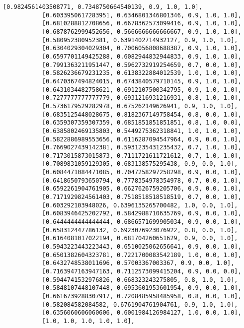 \documentclass[11pt]{article}
\begin{document}
\begin{Verbatim}[commandchars=\\\{\}]
           [0.9824561403508771, 0.7348750664540139, 0.9, 1.0, 1.0],
           [0.6033950617283951, 0.6346801346801346, 0.9, 1.0, 1.0],
           [0.6810288812708656, 0.6678362573099416, 0.9, 1.0, 1.0],
           [0.6878762999452656, 0.5666666666666667, 0.9, 1.0, 1.0],
           [0.580952380952381, 0.6391402714932127, 0.9, 1.0, 1.0],
           [0.6304029304029304, 0.7006056808688387, 0.9, 1.0, 1.0],
           [0.6597701149425288, 0.6082944832944833, 0.9, 1.0, 1.0],
           [0.7991363211951447, 0.5962732919254659, 0.7, 0.0, 1.0],
           [0.5826236679231235, 0.6138322884012539, 1.0, 1.0, 1.0],
           [0.6470367494824015, 0.6743840579710145, 0.9, 1.0, 1.0],
           [0.6431034482758621, 0.6912107500342795, 0.9, 1.0, 1.0],
           [0.7277777777777779, 0.6931216931216931, 0.8, 1.0, 1.0],
           [0.5736179529282978, 0.675262149626941, 0.9, 1.0, 1.0],
           [0.6835125448028675, 0.8182367149758454, 0.8, 0.0, 1.0],
           [0.6359307359307359, 0.6851851851851851, 0.8, 1.0, 0.0],
           [0.6385802469135803, 0.5449275362318841, 1.0, 1.0, 1.0],
           [0.5822886989553656, 0.6116287094547964, 0.9, 0.0, 1.0],
           [0.7669027439142381, 0.5931235431235432, 0.7, 1.0, 1.0],
           [0.7173015873015873, 0.7111721611721612, 0.7, 1.0, 1.0],
           [0.7089831059129305, 0.683138575295438, 0.9, 0.0, 1.0],
           [0.6084471084471085, 0.7047258297258298, 0.9, 0.0, 1.0],
           [0.6418650793650794, 0.7778354978354978, 0.7, 0.0, 1.0],
           [0.6592261904761905, 0.6627626759205706, 0.9, 0.0, 1.0],
           [0.7171929824561403, 0.7518518518518519, 0.7, 0.0, 1.0],
           [0.603292103948026, 0.6396135265700482, 1.0, 0.0, 1.0],
           [0.6083946425202792, 0.5842988710635769, 0.9, 0.0, 1.0],
           [0.6444444444444444, 0.6866571699905034, 0.9, 0.0, 1.0],
           [0.658312447786132, 0.6923076923076922, 0.8, 0.0, 1.0],
           [0.6164081017022194, 0.681704260651629, 0.9, 0.0, 1.0],
           [0.5943223443223443, 0.6510025062656641, 0.9, 0.0, 1.0],
           [0.6501382604323781, 0.7221700083542189, 1.0, 0.0, 1.0],
           [0.6432748538011696, 0.57003367003367, 0.9, 0.0, 1.0],
           [0.7163947163947163, 0.7112573099415204, 0.9, 0.0, 0.0],
           [0.5944741532976826, 0.668323243275805, 0.8, 1.0, 1.0],
           [0.5848107448107448, 0.6953601953601954, 0.9, 0.0, 1.0],
           [0.6616739288307917, 0.7208485958485958, 0.8, 0.0, 1.0],
           [0.582084582084582, 0.6761904761904761, 0.9, 1.0, 1.0],
           [0.6356060606060606, 0.6001984126984127, 1.0, 0.0, 1.0],
           [1.0, 1.0, 1.0, 1.0, 1.0],

\end{Verbatim}
\end{document}
